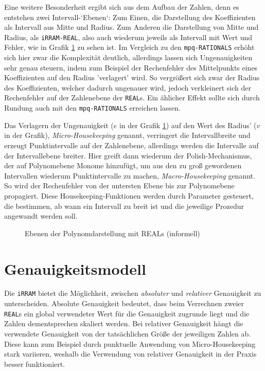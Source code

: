 Eine weitere Besonderheit ergibt sich aus dem Aufbau der Zahlen, denn es entstehen zwei Intervall-`Ebenen`: Zum Einen, die Darstellung des Koeffizienten als Intervall aus Mitte und Radius. Zum Anderen die Darstellung von Mitte und Radius, als \verb+iRRAM-REAL+, also auch wiederum jeweils als Intervall mit Wert und Fehler, wie in Grafik \ref{fig:levels} zu sehen ist. Im Vergleich zu den \verb+mpq-RATIONALS+ erhöht sich hier zwar die Komplexität deutlich, allerdings lassen sich Ungenauigkeiten sehr genau steuern, indem zum Beispiel der Rechenfehler des Mittelpunkts eines Koeffizienten auf den Radius 'verlagert' wird. So vergrößert sich zwar der Radius des Koeffizienten, welcher dadurch ungenauer wird, jedoch verkleinert sich der Rechenfehler auf der Zahlenebene der \verb+REAL+s. Ein ählicher Effekt sollte sich durch Rundung auch mit den \verb+mpq-RATIONALS+ erreichen lassen. 


Das Verlagern der Ungenauigkeit ($e$ in der Grafik \ref{fig:levels}) auf den Wert des Radius' ($v$ in der Grafik), \textit{Micro-Housekeeping} genannt, verringert die Intervallbreite und erzeugt Punktintervalle auf der Zahlenebene, allerdings werden die Intervalle auf der Intervallebene breiter. Hier greift dann wiederum der Polish-Mechanismus, der auf Polynomebene Monome hinzufügt, um aus den zu groß gewordenen Intervallen wiederum Punktintervalle zu machen, \textit{Macro-Housekeeping} genannt. So wird der Rechenfehler von der untersten Ebene bis zur Polynomebene propagiert.
Diese Housekeeping-Funktionen werden durch Parameter gesteuert, die bestimmen, ab wann ein Intervall zu breit ist und die jeweilige Prozedur angewandt werden soll.

\begin{figure}[ht]
\label{fig:levels}
\begin{center}
 
 
 \caption{Ebenen der Polynomdarstellung mit REALs (informell)}
 \end{center}
\end{figure}


\section{Genauigkeitsmodell}
Die \verb+iRRAM+ bietet die Möglichkeit, zwischen \textit{absoluter} und \textit{relativer} Genauigkeit zu unterscheiden. Absolute Genauigkeit bedeutet, dass beim Verrechnen zweier \verb+REAL+s ein global verwendeter Wert für die Genauigkeit zugrunde liegt und die Zahlen dementsprechen skaliert werden. Bei relativer Genauigkeit hängt die verwendete Genauigkeit von der tatsächlichen Größe der jeweiligen Zahlen ab. Diese kann zum Beispiel durch punktuelle Anwendung von Micro-Housekeeping stark variieren, weshalb die Verwendung von relativer Genauigkeit in der Praxis besser funktioniert.


